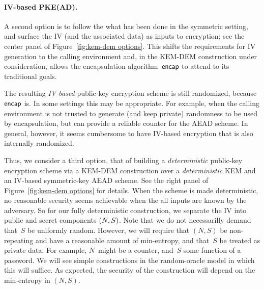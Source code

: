 \paragraph{IV-based PKE(AD). }
A second option is to follow the what has been done in the symmetric setting, and surface the IV (and the associated data) as inputs to encryption; see the center panel of Figure~\ref{fig:kem-dem options}.  
This shifts the requirements for IV generation to the calling environment and, in the KEM-DEM construction under consideration, allows the encapsulation algorithm~$\mathsf{encap}$ to attend to its traditional goals.  %

The resulting \emph{IV-based} public-key encryption scheme is still randomized, because $\mathsf{encap}$ is.  In some settings this may be appropriate.  For example, when the calling environment is not trusted to generate (and keep private) randomness to be used by encapsulation, but can provide a reliable counter for the AEAD scheme.    In general, however, it seems cumbersome to have IV-based encryption that is also internally randomized.  

Thus, we consider a third option, that of building a \emph{deterministic} public-key encryption scheme via a KEM-DEM construction over a \emph{deterministic} KEM and an IV-based symmetric-key AEAD scheme.  See the right panel of Figure~\ref{fig:kem-dem options} for details.  
When the scheme is made deterministic, no reasonable security seems achievable when the all inputs are known by the adversary.  So for our fully deterministic construction, we separate the IV into public and secret components $(N,S)$.   
Note that we do not necessarilly demand that~$S$ be uniformly random.  However, we will require that $(N,S)$ be non-repeating and have a reasonable amount of min-entropy, and that~$S$ be treated as private data.   For example, $N$~might be a counter, and~$S$ some function of a password.  We will see simple constructions in the random-oracle model in which this will suffice. As expected, the security of the construction will depend on the min-entropy in $(N,S)$. 


